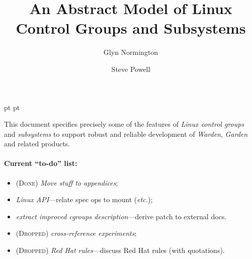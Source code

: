 \documentclass[a4paper,twoside,12pt]{article}
\begin{document}
 pt
 pt

\def\Slash{\slash\hspace{0pt}}

\title{An Abstract Model of Linux Control Groups and Subsystems}

\author{
Glyn Normington\and
Steve Powell
}

\maketitle
\thispagestyle{myheadings}
\setcounter{page}{1}


This document specifies precisely some of the features of \emph{Linux control groups} and \emph{subsystems} to support robust and reliable development of \emph{Warden}, \emph{Garden} and related products.

\paragraph{Current ``to-do'' list:}
\begin{itemize}
\item (\textsc{Done}) \emph{Move stuff to appendices};
\item \emph{Linux API}---relate spec ops to mount (\emph{etc.});
\item \emph{extract improved cgroups description}---derive patch to external docs.
\item (\textsc{Dropped}) \emph{cross-reference experiments};
\item (\textsc{Dropped}) \emph{Red Hat rules}---discuss  Red Hat rules (with quotations).
\end{itemize}


\newcommand{\true}{true}
\newcommand{\false}{false}
\renewcommand{\emptyset}{\varnothing}

\clearpage
\tableofcontents

\cleardoublepage
{}
\end{document}
